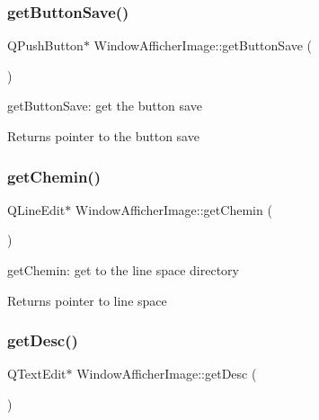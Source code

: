 \subsubsection{\texorpdfstring{get\+Button\+Save()}{getButtonSave()}}
{\footnotesize\ttfamily Q\+Push\+Button$\ast$ Window\+Afficher\+Image\+::get\+Button\+Save (\begin{DoxyParamCaption}{ }\end{DoxyParamCaption})\hspace{0.3cm}{\ttfamily [inline]}}



get\+Button\+Save\+: get the button save 

\begin{DoxyReturn}{Returns}
pointer to the button save 
\end{DoxyReturn}
\mbox{\label{class_window_afficher_image_a59e27e3dbd1f2bc4a0d9fe99a20025fb}} 
\subsubsection{\texorpdfstring{get\+Chemin()}{getChemin()}}
{\footnotesize\ttfamily Q\+Line\+Edit$\ast$ Window\+Afficher\+Image\+::get\+Chemin (\begin{DoxyParamCaption}{ }\end{DoxyParamCaption})\hspace{0.3cm}{\ttfamily [inline]}}



get\+Chemin\+: get to the line space directory 

\begin{DoxyReturn}{Returns}
pointer to line space 
\end{DoxyReturn}
\mbox{\label{class_window_afficher_image_a0abeb04216548502d7026bad0c00d0f4}} 
\subsubsection{\texorpdfstring{get\+Desc()}{getDesc()}}
{\footnotesize\ttfamily Q\+Text\+Edit$\ast$ Window\+Afficher\+Image\+::get\+Desc (\begin{DoxyParamCaption}{ }\end{DoxyParamCaption})\hspace{0.3cm}{\ttfamily [inline]}}



